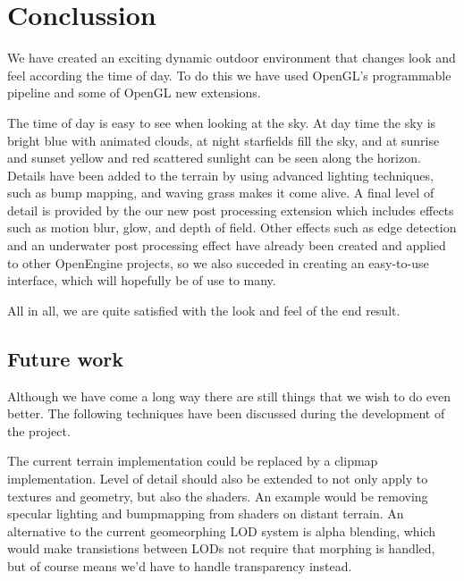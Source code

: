 
\chapter{Conclussion}

We have created an exciting dynamic outdoor environment that changes
look and feel according the time of day. To do this we have used
OpenGL's programmable pipeline and some of OpenGL new extensions.

The time of day is easy to see when looking at the sky. At day time
the sky is bright blue with animated clouds, at night starfields fill
the sky, and at sunrise and sunset yellow and red scattered sunlight
can be seen along the horizon.
%
Details have been added to the terrain by using advanced lighting
techniques, such as bump mapping, and waving grass makes it come alive.
%
A final level of detail is provided by the our new post processing
extension which includes effects such as motion blur, glow, and depth of
field. Other effects such as edge detection and an underwater post
processing effect have already been created and applied to other
OpenEngine projects, so we also succeded in creating an easy-to-use
interface, which will hopefully be of use to many.

All in all, we are quite satisfied with the look and feel of the end
result.








\section{Future work}

Although we have come a long way there are still things that we wish
to do even better. The following techniques have been discussed during
the development of the project.

The current terrain implementation could be replaced by a clipmap
implementation. Level of detail should also be extended to not only
apply to textures and geometry, but also the shaders. An example would
be removing specular lighting and bumpmapping from shaders on distant
terrain. An alternative to the current geomeorphing LOD system is
alpha blending, which would make transistions between LODs not require
that morphing is handled, but of course means we'd have to handle
transparency instead.

